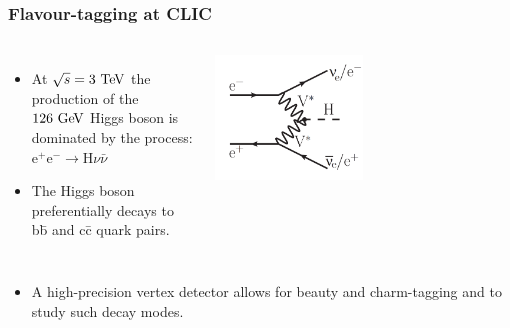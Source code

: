 \begin{frame}
  \frametitle{Flavour-tagging at CLIC}

  \begin{columns}
    \begin{itemize}
    \item At $\sqrt{s}=3\,\mathrm{\,Te\kern -0.1em V}$ the production of the $126\,\mathrm{\,Ge\kern -0.1em V}$
      Higgs
      boson is dominated by the process: \\
      e$^+$e$^- \rightarrow$H$\nu\bar{\nu}$
    \item The Higgs boson preferentially decays to b\={b} and c\={c}
      quark pairs.
    \end{itemize}

    \centering
    \includegraphics[width=0.5\textwidth]{figures/feynman_higgs.png}
  \end{columns}

  \begin{itemize}
  \item A high-precision vertex detector allows for beauty and
    charm-tagging and to study such decay modes.
  \end{itemize}


\end{frame}
